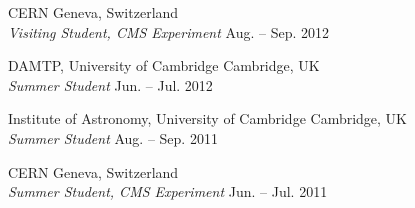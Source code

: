 \documentclass[11pt]{article}
\newenvironment{packed_itemize}{
\begin{itemize}
  \setlength{\itemsep}{3pt}
  \setlength{\parskip}{0pt}
  \setlength{\parsep}{0pt}}{\end{itemize}
}
\begin{document}
\begin{packed_itemize}
\item CERN \hfill Geneva, Switzerland \\ \emph{Visiting Student, CMS Experiment} \hfill Aug. -- Sep. 2012
\item DAMTP, University of Cambridge \hfill Cambridge, UK \\ \emph{Summer Student} \hfill Jun. -- Jul. 2012
\item Institute of Astronomy, University of Cambridge \hfill Cambridge, UK \\ \emph{Summer Student} \hfill Aug. -- Sep. 2011
\item CERN \hfill Geneva, Switzerland \\ \emph{Summer Student, CMS Experiment} \hfill Jun. -- Jul. 2011

\end{packed_itemize}

\vspace*{\fill}
\end{document}
